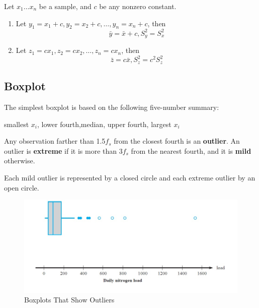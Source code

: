\begin{prop}
  Let $x_1 \dots x_n$ be a sample, and $c$ be any nonzero constant.
  \begin{enumerate}
    \item Let $y_1=x_1+c,y_2=x_2+c,\dots,y_n=x_n+c$, then
    \[\bar{y}=\bar{x}+c, S_y^2=S_x^2\]
    \item Let $z_1=cx_1,z_2=cx_2,\dots,z_n=cx_n$, then
    \[\bar{z}=c \bar{x}, S_z^2=c^2S_z^2\]
    \end{enumerate}
\end{prop}

\subsection{Boxplot}
The simplest boxplot is based on the following five-number summary:

smallest $x_i$, \quad lower fourth,\quad median, \quad upper fourth, \quad largest $x_i$
\begin{defn}
  Any observation farther than 1.5$f_s$ from the closest fourth is an \textbf{outlier}. An outlier is \textbf{extreme} if it is more than 3$f_s$ from the nearest fourth, and it is \textbf{mild} otherwise.
\end{defn}

Each mild outlier is represented by a closed circle and each extreme outlier by an open circle.

\begin{figure}[H]
\centering
\includegraphics{figures/boxplot.jpg}
\caption{Boxplots That Show Outliers}
\label{fig:3}
\end{figure}